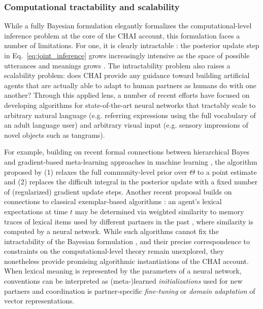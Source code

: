 \subsubsection{Computational tractability and scalability}

While a fully Bayesian formulation elegantly formalizes the computational-level inference problem at the core of the CHAI account, this formulation faces a number of limitations. 
For one, it is clearly intractable \cite{van2008tractable,van2019cognition}: the posterior update step in Eq.~\ref{eq:joint_inference} grows increasingly intensive as the space of possible utterances and meanings grows \cite{scalingupmodels}.
The intractability problem also raises a scalability problem: does CHAI provide any guidance toward building artificial agents that are actually able to adapt to human partners as humans do with one another?
Through this applied lens, a number of recent efforts have focused on developing algorithms for state-of-the-art neural networks that tractably scale to arbitrary natural language (e.g. referring expressions using the full vocabulary of an adult language user) and arbitrary visual input (e.g. sensory impressions of novel objects such as tangrams).

For example, building on recent formal connections between hierarchical Bayes and gradient-based meta-learning approaches in machine learning \cite{grant_recasting_2018}, the algorithm proposed by  (1) relaxes the full community-level prior over $\Theta$ to a point estimate and (2) replaces the difficult integral in the posterior update with a fixed number of (regularized) gradient update steps.
Another recent proposal builds on connections to classical exemplar-based algorithms \cite{nosofsky1984choice}: an agent's lexical expectations at time $t$ may be determined via weighted similarity to memory traces of lexical items used by different partners in the past \cite{shi2010exemplar}, where similarity is computed by a neural network. 
While such algorithms cannot fix the intractability of the Bayesian formulation \cite{kwisthout2011bayesian}, and their precise correspondence to constraints on the computational-level theory remain unexplored, they nonetheless provide promising algorithmic instantiations of the CHAI account. 
When lexical meaning is represented by the parameters of a neural network, conventions can be interpreted as (meta-)learned \emph{initializations} used for new partners and coordination is partner-specific \emph{fine-tuning} or \emph{domain adaptation} of vector representations. 

